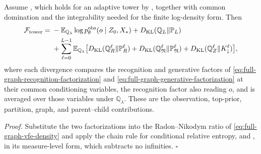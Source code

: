 Assume , which holds for an adaptive tower by
, together with common domination and the
integrability needed for the finite log-density form. Then
\begin{align}
\mathcal F_{\mathrm{tower}}
={}&-\mathbb E_{\mathbb Q_\lambda}\log p^{\mathrm{obs}}_\theta(o\mid Z_0,X_*)
+D_{\mathrm{KL}}(\mathbb Q_L\Vert\mathbb P_L)
\nonumber\\
&+\sum_{\ell=0}^{L-1}\mathbb E_{\mathbb Q_\lambda}\bigl[
D_{\mathrm{KL}}(\mathbb Q^\ell_R\Vert\mathbb P^\ell_R)
+D_{\mathrm{KL}}(\mathbb Q^\ell_{\mathfrak N}\Vert\mathbb P^\ell_{\mathfrak N})
+D_{\mathrm{KL}}(\mathbb Q^\ell_Z\Vert K^\ell_\downarrow)\bigr],
\label{eq:full-graph-vfe-factorized}
\end{align}
where each divergence compares the recognition and generative factors of
\eqref{eq:full-graph-recognition-factorization} and
\eqref{eq:full-graph-generative-factorization} at their common conditioning
variables, the recognition factor also reading $o$, and is averaged over those
variables under $\mathbb Q_\lambda$. These are the observation, top-prior,
partition, graph, and parent--child contributions. 

\noindent\emph{Proof.}
Substitute the two factorizations into the Radon--Nikodym ratio of
\eqref{eq:full-graph-vfe-density} and apply the chain rule for conditional relative
entropy,  and \citet[Sec.~2.5]{CoverThomas2006}, in its
measure-level form, which subtracts no infinities. $\square$

